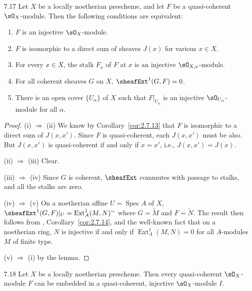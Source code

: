 \begin{bookproposition}{7.17}\label{prop:2.7.17}
Let $X$ be a locally noetherian prescheme, and let $F$ be a quasi-coherent $\sO_X$-module. Then the following conditions are equivalent:
\begin{enumerate}
\item[(i)] $F$ is an injective $\sO_X$-module.
\item[(ii)] $F$ is isomorphic to a direct sum of sheaves $J(x)$ for various $x\in X$.
\item[(iii)] For every $x\in X$, the stalk $F_x$ of $F$ at $x$ is an injective $\sO_{X,x}$-module.
\item[(iv)] For all coherent sheaves $G$ on $X$, $\sheafExt^1(G,F)=0$.
\item[(v)] There is an open cover $\{U_\alpha\}$ of $X$ such that $F|_{U_\alpha}$ is an injective $\sO_{U_\alpha}$-module for all $\alpha$.
\end{enumerate}
\end{bookproposition}

\begin{proof}
(i) $\Longrightarrow$ (ii) We know by Corollary~\ref{cor:2.7.13} that $F$ is isomorphic to a direct sum of $J(x,x')$. Since $F$ is quasi-coherent, each $J(x,x')$ must be also. But $J(x,x')$ is quasi-coherent if and only if $x=x'$, i.e., $J(x,x')=J(x)$.

(ii) $\Longrightarrow$ (iii) Clear.

(iii) $\Longrightarrow$ (iv) Since $G$ is coherent, $\sheafExt$ commutes with passage to stalks, and all the stalks are zero.

(iv) $\Longrightarrow$ (v) On a noetherian affine $U=\operatorname{Spec}A$ of $X$, $\sheafExt^1(G,F)|_U=\operatorname{Ext}^1_A(M,N)^{\sim}$ where $G=\widetilde{M}$ and $F=\widetilde{N}$. The result then follows from \cite[\nopp I,~9.4.8]{EGA}, Corollary~\ref{cor:2.7.14}, and the well-known fact that on a noetherian ring, $N$ is injective if and only if $\operatorname{Ext}^1_A(M,N)=0$ for all $A$-modules $M$ of finite type.

(v) $\Longrightarrow$ (i) by the lemma.
\end{proof}

\begin{booktheorem}{7.18}\label{thm:2.7.18}
Let $X$ be a locally noetherian prescheme. Then every quasi-coherent $\sO_X$-module $F$ can be embedded in a quasi-coherent, injective $\sO_X$-module $I$.
\end{booktheorem}

